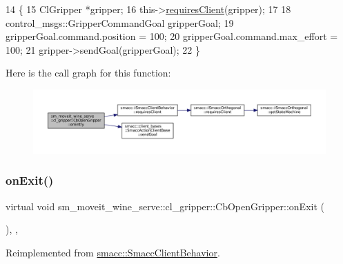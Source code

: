 \begin{DoxyCode}
14     \{
15         ClGripper *gripper;
16         this->\hyperlink{classsmacc_1_1ISmaccClientBehavior_a32b16e99e3b4cb289414203dc861a440}{requiresClient}(gripper);
17 
18         control\_msgs::GripperCommandGoal gripperGoal;
19         gripperGoal.command.position = 100;
20         gripperGoal.command.max\_effort = 100;
21         gripper->sendGoal(gripperGoal);
22     \}
\end{DoxyCode}
Here is the call graph for this function\+:
\nopagebreak
\begin{figure}[H]
\begin{center}
\leavevmode
\includegraphics[width=350pt]{classsm__moveit__wine__serve_1_1cl__gripper_1_1CbOpenGripper_aa54be14caa3617182da50f7ad5541ed4_cgraph}
\end{center}
\end{figure}
\mbox{\label{classsm__moveit__wine__serve_1_1cl__gripper_1_1CbOpenGripper_a2e44d207617c4a1d27c35668a5080832}} 
\subsubsection{\texorpdfstring{on\+Exit()}{onExit()}}
{\footnotesize\ttfamily virtual void sm\+\_\+moveit\+\_\+wine\+\_\+serve\+::cl\+\_\+gripper\+::\+Cb\+Open\+Gripper\+::on\+Exit (\begin{DoxyParamCaption}{ }\end{DoxyParamCaption})\hspace{0.3cm}{\ttfamily [inline]}, {\ttfamily [override]}, {\ttfamily [virtual]}}



Reimplemented from \hyperlink{classsmacc_1_1SmaccClientBehavior_a7e4fb6ce81ff96dc172425852d69c0c5}{smacc\+::\+Smacc\+Client\+Behavior}.



